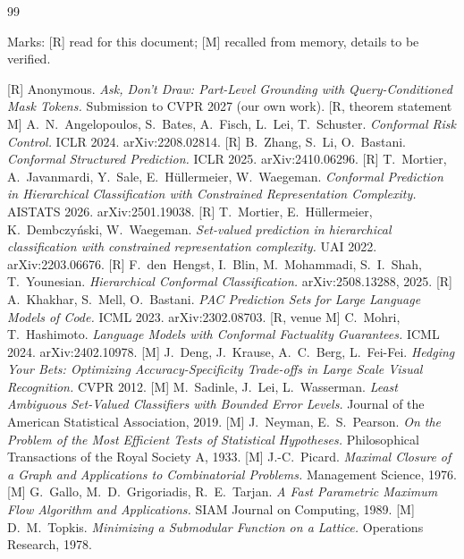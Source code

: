 \documentclass[11pt,a4paper]{article}
\theoremstyle{definition}
\theoremstyle{remark}
\begin{document}
\begin{thebibliography}{99}
\small
\item[] Marks: [R] read for this document; [M] recalled from memory, details to be verified.

 [R] Anonymous. \emph{Ask, Don't Draw: Part-Level Grounding with Query-Conditioned Mask Tokens.}
Submission to CVPR 2027 (our own work).
 [R, theorem statement M] A.~N.~Angelopoulos, S.~Bates, A.~Fisch, L.~Lei, T.~Schuster.
\emph{Conformal Risk Control.} ICLR 2024. arXiv:2208.02814.
 [R] B.~Zhang, S.~Li, O.~Bastani. \emph{Conformal Structured Prediction.} ICLR 2025. arXiv:2410.06296.
 [R] T.~Mortier, A.~Javanmardi, Y.~Sale, E.~H\"ullermeier, W.~Waegeman. \emph{Conformal
Prediction in Hierarchical Classification with Constrained Representation Complexity.} AISTATS 2026.
arXiv:2501.19038.
 [R] T.~Mortier, E.~H\"ullermeier, K.~Dembczy\'nski, W.~Waegeman. \emph{Set-valued prediction in
hierarchical classification with constrained representation complexity.} UAI 2022. arXiv:2203.06676.
 [R] F.~den~Hengst, I.~Blin, M.~Mohammadi, S.~I.~Shah, T.~Younesian. \emph{Hierarchical Conformal
Classification.} arXiv:2508.13288, 2025.
 [R] A.~Khakhar, S.~Mell, O.~Bastani. \emph{PAC Prediction Sets for Large Language Models of Code.}
ICML 2023. arXiv:2302.08703.
 [R, venue M] C.~Mohri, T.~Hashimoto. \emph{Language Models with Conformal Factuality Guarantees.}
ICML 2024. arXiv:2402.10978.
 [M] J.~Deng, J.~Krause, A.~C.~Berg, L.~Fei-Fei. \emph{Hedging Your Bets: Optimizing
Accuracy-Specificity Trade-offs in Large Scale Visual Recognition.} CVPR 2012.
 [M] M.~Sadinle, J.~Lei, L.~Wasserman. \emph{Least Ambiguous Set-Valued Classifiers with Bounded
Error Levels.} Journal of the American Statistical Association, 2019.
 [M] J.~Neyman, E.~S.~Pearson. \emph{On the Problem of the Most Efficient Tests of Statistical
Hypotheses.} Philosophical Transactions of the Royal Society A, 1933.
 [M] J.-C.~Picard. \emph{Maximal Closure of a Graph and Applications to Combinatorial Problems.}
Management Science, 1976.
 [M] G.~Gallo, M.~D.~Grigoriadis, R.~E.~Tarjan. \emph{A Fast Parametric Maximum Flow Algorithm and
Applications.} SIAM Journal on Computing, 1989.
 [M] D.~M.~Topkis. \emph{Minimizing a Submodular Function on a Lattice.} Operations Research, 1978.

\end{thebibliography}
\end{document}
